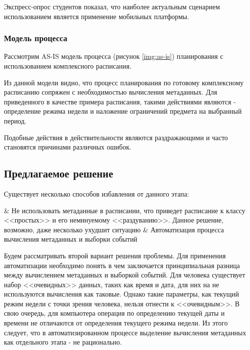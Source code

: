 Экспресс-опрос студентов показал, что наиболее актуальным сценарием использованием является применение мобильных платформы.

\subsubsection{Модель процесса}

Рассмотрим AS-IS модель процесса (рисунок \ref{img:as-is}) планирования с использованием комплексного расписания.


Из данной модели видно, что процесс планирования по готовому комплексному расписанию сопряжен с необходимостью вычисления метаданных.
Для приведенного в качестве примера расписания, такими действиями являются - определение режима недели и наложение ограничений предмета на выбранный период.

Подобные действия в действительности являются раздражающими и часто становятся причинами различных ошибок.

\subsection{Предлагаемое решение}

Существует несколько способов избавления от данного этапа:
\begin{easylist}
  & Не использовать метаданные в расписании, что приведет расписание к классу <<простых>> и его неминуемому <<раздуванию>>. Данное решение, возможно, даже несколько ухудшит ситуацию
  & Автоматизация процесса вычисления метаданных и выборки событий
\end{easylist}

Будем рассматривать второй вариант решения проблемы.
Для применения автоматизации необходимо понять в чем заключается принципиальная разница между вычислением метаданных и выборкой событий.
Для человека существует набор <<очевидных>> данных, таких как время и дата, для них на не используются вычисления как таковые.
Однако такие параметры, как текущий режим недели с точки зрения человека, нельзя отнести к <<очевидным>>.
В свою очередь, для компьютера операция по определению текущей даты и времени не отличаются от определения текущего режима недели.
Из этого следует, что в автоматизированном процессе выделение вычисления метаданных как отдельного этапа - не рационально.

